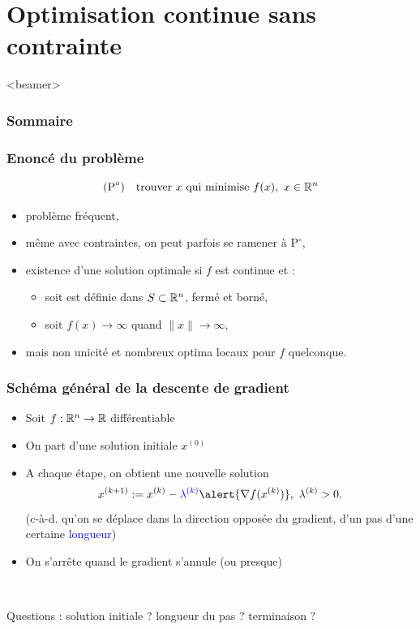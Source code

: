 \documentclass{beamer}
\newcommand{\R}{{\ensuremath\mathbb{R}}}
\begin{document}
\section{Optimisation continue sans contrainte}

\begin{frame}<beamer>
  \frametitle{Sommaire}
  \tableofcontents[currentsection]
\end{frame}

\begin{frame}
  \frametitle{Enoncé du problème}

  \[
  (\text{P}^\circ) \quad
    \text{trouver} \ x \ \text{qui minimise} \ f(x), \ x \in \R^n
  \]

  \begin{itemize}
  \item problème fréquent,
  \item même avec contraintes, on peut parfois se ramener à $\text{P}^\circ$,
  \item existence d'une solution optimale si $f$ est continue et :
    \begin{itemize}
    \item soit est définie dans $S \subset \R^n$, fermé et borné,
    \item soit $f(x) \rightarrow \infty$ quand $\|x\| \rightarrow \infty$, 
    \end{itemize}
  \item mais non unicité et nombreux optima locaux pour $f$ quelconque.
  \end{itemize}
  
\end{frame}

\begin{frame}
  \frametitle{Schéma général de la descente de gradient}

  \begin{itemize}
  \item Soit $f : \R^n \rightarrow \R$ différentiable
  \item On part d'une solution initiale $x^{(0)}$
  \item A chaque étape, on obtient une nouvelle solution
    \[ x^{(k+1)} := x^{(k)} - \textcolor{blue}{\lambda^{(k)}} \alert{{\nabla f}(x^{(k)})}, \ \lambda^{(k)} > 0. \]
    (c-à-d. qu'on se déplace dans la direction opposée du \alert{gradient},
    d'un pas d'une certaine \textcolor{blue}{longueur})
  \item On s'arrête quand le gradient s'annule (ou presque)
  \end{itemize}

  ~

  Questions : 
  solution initiale ?
  longueur du pas ?
  terminaison ?
\end{frame}
\end{document}
